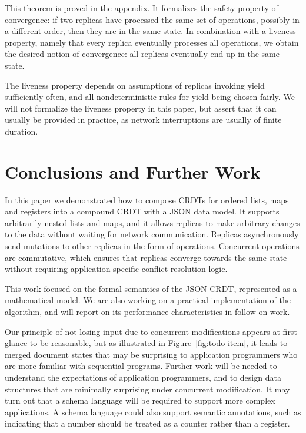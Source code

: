 \documentclass[10pt,journal,compsoc]{IEEEtran}
\begin{document}
This theorem is proved in the appendix. It formalizes the safety property of convergence: if two replicas have processed the same set of operations, possibly in a different order, then they are in the same state. In combination with a liveness property, namely that every replica eventually processes all operations, we obtain the desired notion of convergence: all replicas eventually end up in the same state.

The liveness property depends on assumptions of replicas invoking \textsf{yield} sufficiently often, and all nondeterministic rules for \textsf{yield} being chosen fairly. We will not formalize the liveness property in this paper, but assert that it can usually be provided in practice, as network interruptions are usually of finite duration.

\section{Conclusions and Further Work}

In this paper we demonstrated how to compose CRDTs for ordered lists, maps and registers into a compound CRDT with a JSON data model. It supports arbitrarily nested lists and maps, and it allows replicas to make arbitrary changes to the data without waiting for network communication. Replicas asynchronously send mutations to other replicas in the form of operations. Concurrent operations are commutative, which ensures that replicas converge towards the same state without requiring application-specific conflict resolution logic.

This work focused on the formal semantics of the JSON CRDT, represented as a mathematical model. We are also working on a practical implementation of the algorithm, and will report on its performance characteristics in follow-on work.

Our principle of not losing input due to concurrent modifications appears at first glance to be reasonable, but as illustrated in Figure~\ref{fig:todo-item}, it leads to merged document states that may be surprising to application programmers who are more familiar with sequential programs. Further work will be needed to understand the expectations of application programmers, and to design data structures that are minimally surprising under concurrent modification. It may turn out that a schema language will be required to support more complex applications. A schema language could also support semantic annotations, such as indicating that a number should be treated as a counter rather than a register.
\end{document}

